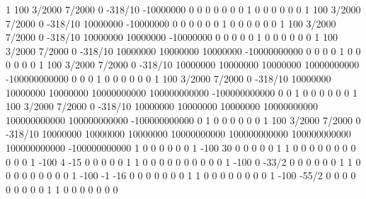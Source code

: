  1  100    3/2000    7/2000    0 -318/10  -10000000         0         0            0             0             0             0             0        1         0         0         0          0          0           0
 1  100    3/2000    7/2000    0 -318/10   10000000 -10000000         0            0             0             0             0             0        1         0         0         0          0          0           0
 1  100    3/2000    7/2000    0 -318/10   10000000  10000000 -10000000            0             0             0             0             0        1         0         0         0          0          0           0
 1  100    3/2000    7/2000    0 -318/10   10000000  10000000  10000000 -10000000000             0             0             0             0        1         0         0         0          0          0           0
 1  100    3/2000    7/2000    0 -318/10   10000000  10000000  10000000  10000000000 -100000000000             0             0             0        1         0         0         0          0          0           0
 1  100    3/2000    7/2000    0 -318/10   10000000  10000000  10000000  10000000000  100000000000 -100000000000             0             0        1         0         0         0          0          0           0
 1  100    3/2000    7/2000    0 -318/10   10000000  10000000  10000000  10000000000  100000000000  100000000000 -100000000000             0        1         0         0         0          0          0           0
 1  100    3/2000    7/2000    0 -318/10   10000000  10000000  10000000  10000000000  100000000000  100000000000  100000000000 -100000000000        1         0         0         0          0          0           0
 1 -100   30    0                 0    0          0         0         1            1             0             0             0             0        0         0         0         0          0          0           0
 1 -100    4  -15                 0    0          0         0         0            1             1             0             0             0        0         0         0         0          0          0           0
 1 -100    0  -33/2               0    0          0         0         0            0             1             1             0             0        0         0         0         0          0          0           0
 1 -100   -1  -16                 0    0          0         0         0            0             0             1             1             0        0         0         0         0          0          0           0
 1 -100  -55/2    0               0    0          0         0         0            0             0             0             1             1        0         0         0         0          0          0           0
